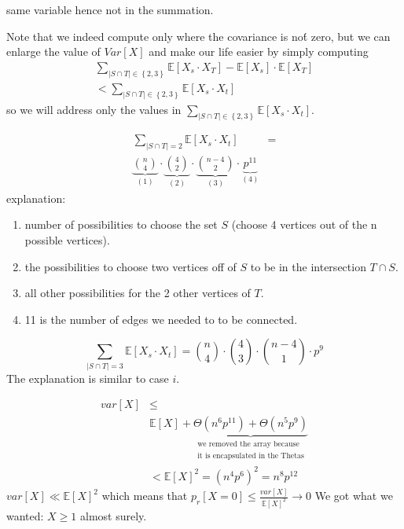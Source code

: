\begin{casenv}
same variable hence not in the summation.
\begin{remark}
Note that we indeed compute only where the covariance is no\'{t} zero,
but we can enlarge the value of $Var\left[X\right]$ and make our
life easier by simply computing 
\begin{align*}
\sum\limits _{\left|S\cap T\right|\in\left\{ 2,3\right\} }\mathbb{E}\left[X_{s}\cdot X_{T}\right]-\mathbb{E}\left[X_{s}\right]\cdot\mathbb{E}\left[X_{T}\right]\\
<\sum\limits _{\left|S\cap T\right|\in\left\{ 2,3\right\} }\mathbb{E}\left[X_{s}\cdot X_{t}\right]
\end{align*}
 so we will address only the values in $\sum\limits _{\left|S\cap T\right|\in\left\{ 2,3\right\} }\mathbb{E}\left[X_{s}\cdot X_{t}\right]$.
\end{remark}

\begin{casenv}
\item 
\begin{align*}
\sum\limits _{\left|S\cap T\right|=2}\mathbb{E}\left[X_{s}\cdot X_{t}\right] & =\\
\underbrace{\binom{n}{4}}_{\left(1\right)}\cdot\underbrace{\binom{4}{2}}_{\left(2\right)}\cdot\underbrace{\binom{n-4}{2}}_{\left(3\right)}\cdot\underbrace{p^{11}}_{\left(4\right)}
\end{align*}
 explanation:
\begin{enumerate}
\item number of possibilities to choose the set $S$ (choose 4 vertices
out of the n possible vertices).
\item the possibilities to choose two vertices off of $S$ to be in the
intersection $T\cap S$.
\item all other possibilities for the 2 other vertices of $T$.
\item 11 is the number of edges we needed to to be connected. 
\end{enumerate}
\item 
\[
\sum\limits _{\left|S\cap T\right|=3}\mathbb{E}\left[X_{s}\cdot X_{t}\right]=\binom{n}{4}\cdot\binom{4}{3}\cdot\binom{n-4}{1}\cdot p^{9}
\]
 The explanation is similar to case $i$.
\end{casenv}
\begin{align*}
var\left[X\right] & \le\\
 & \mathbb{E}\left[X\right]+\underbrace{\Theta\left(n^{6}p^{11}\right)+\Theta\left(n^{5}p^{9}\right)}_{\begin{array}{c}
\text{we removed the array because }\\
\text{it is encapsulated in the Thetas}
\end{array}}\\
 & <\mathbb{E}\left[X\right]^{2}=\left(n^{4}p^{6}\right)^{2}=n^{8}p^{12}
\end{align*}
 $var\left[X\right]\ll\mathbb{E}\left[X\right]^{2}$ which means that
$p_{r}\left[X=0\right]\le\frac{var\left[X\right]}{\mathbb{E}\left[X\right]^{2}}\to0$
We got what we wanted: $X\ge1$ almost surely.\\

\end{casenv}
%

